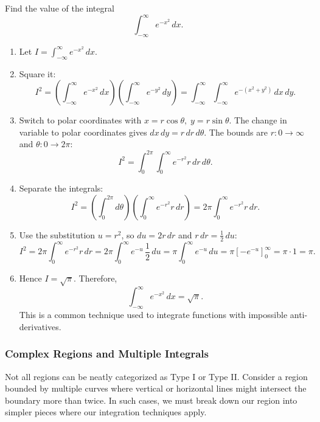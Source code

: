 \exampleline
\begin{example}
Find the value of the integral
\[
\int_{-\infty}^{\infty} e^{-x^2} \,dx.
\]
\begin{solution}
\begin{enumerate}
\item Let \( I = \int_{-\infty}^{\infty} e^{-x^2} \,dx \).

\item Square it:
\[
I^2 = \left(\int_{-\infty}^{\infty} e^{-x^2} \,dx\right)
      \left(\int_{-\infty}^{\infty} e^{-y^2} \,dy\right)
    = \int_{-\infty}^{\infty}\int_{-\infty}^{\infty} e^{-(x^2 + y^2)} \,dx\,dy.
\]

\item Switch to polar coordinates with \( x = r\cos\theta,\; y = r\sin\theta \). The change in variable to polar coordinates gives \( dx\,dy = r\,dr\,d\theta \). The bounds are \( r:0\to\infty \) and \( \theta:0\to 2\pi \):
\[
I^2 = \int_{0}^{2\pi} \int_{0}^{\infty} e^{-r^2} r \,dr\,d\theta.
\]

\item Separate the integrals:
\[
I^2 = \left(\int_{0}^{2\pi} d\theta\right)
      \left(\int_{0}^{\infty} e^{-r^2} r \,dr\right)
    = 2\pi \int_{0}^{\infty} e^{-r^2} r \,dr.
\]

\item Use the substitution \( u = r^2 \), so \( du = 2r\,dr \) and \( r\,dr = \tfrac12\,du \):
\[
I^2 = 2\pi \int_{0}^{\infty} e^{-r^2} r \,dr
    = 2\pi \int_{0}^{\infty} e^{-u} \,\frac12\,du
    = \pi \int_{0}^{\infty} e^{-u}\,du 
    = \pi \left[-e^{-u}\right]_{0}^{\infty} 
    = \pi \cdot 1 
    = \pi.
\]

\item Hence \( I = \sqrt{\pi} \). Therefore,
\[
\int_{-\infty}^{\infty} e^{-x^2} \,dx = \sqrt{\pi}.
\]
\noindent This is a common technique used to integrate functions with impossible anti-derivatives.
\end{enumerate}

\end{solution}
\end{example}
\exampleline


\subsubsection*{Complex Regions and Multiple Integrals}

\noindent Not all regions can be neatly categorized as Type I or Type II. Consider a region bounded by multiple curves where vertical or horizontal lines might intersect the boundary more than twice. In such cases, we must break down our region into simpler pieces where our integration techniques apply. \\

